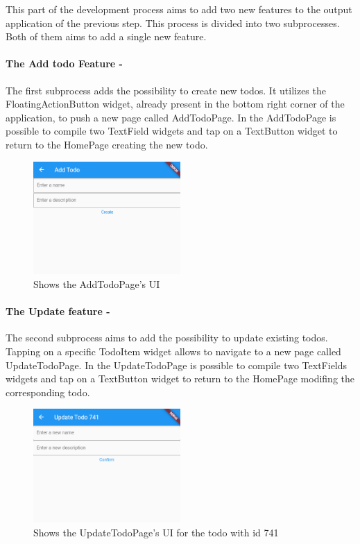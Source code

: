 

This part of the development process aims to add two new features to the output application of the previous step. This process is divided into two subprocesses. Both of them aims to add a single new feature.

\paragraph{The Add todo Feature - }
\label{par:add_todo_feature}
The first subprocess adds the possibility to create new todos. It utilizes the FloatingActionButton widget, already present in the bottom right corner of the application, to push a new page called AddTodoPage. In the AddTodoPage is possible to compile two TextField widgets and tap on a TextButton widget to return to the HomePage creating the new todo.
 

\begin{figure}[H]
    \centering
    \includegraphics[width=0.5\textwidth]{Images/shot_runtime_todoapp_addpage.png}
    \caption{Shows the AddTodoPage's UI}
    \label{fig:add_todo_page_tree_structure}
\end{figure}
\paragraph{The Update feature - }
\label{par:update_todo_feature}
The second subprocess aims to add the possibility to update existing todos. Tapping on a specific TodoItem widget allows to navigate to a new page called UpdateTodoPage. In the UpdateTodoPage is possible to compile two TextFields widgets and tap on a TextButton widget to return to the HomePage modifing the corresponding todo.

\begin{figure}[H]
    \centering
    \includegraphics[width=0.5\textwidth]{Images/shot_runtime_todoapp_updatepage.png}
    \caption{Shows the UpdateTodoPage's UI for the todo with id 741}
    \label{fig:add_todo_page_tree_structure}
\end{figure}